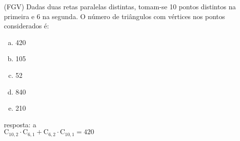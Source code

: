 \begin{ex}
 (FGV) Dadas duas retas paralelas distintas, tomam-se 10 pontos distintos na primeira e 6 na segunda. O número de triângulos com vértices nos pontos considerados é:
    \begin{enumerate}[(a)]
    \item 420
    \item 105
    \item 52
    \item 840
    \item 210   
    \end{enumerate}
      \begin{sol}
        resposta: a \\
        $\mathrm{C}_{{10},2}\cdot\mathrm{C}_{6,1}+\mathrm{C}_{6,2}\cdot\mathrm{C}_{{10},1}=420$
      \end{sol}
\end{ex}